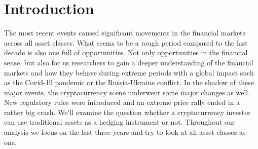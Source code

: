 \documentclass[11pt]{article}
\begin{document}
\titlepageindividualised
\thispagestyle{empty}
\doublespacing

\newpage
\setcounter{page}{1}
\thispagestyle{firststyle}


\newpage
{}

\listoffigures

\thispagestyle{firststyle}
 
\vspace{12px}

\thispagestyle{firststyle}
\listoftables


\newpage
\renewcommand{\contentsname}{Table of Contents}
\thispagestyle{firststyle}

\newpage
\tableofcontents

\newpage
{}
\setcounter{page}{1}
\section{Introduction} \label{sec:introduction}
The most recent events caused significant movements in the financial markets across all asset classes. What seems to be a rough period compared to the last decade is also one full of opportunities. Not only opportunities in the financial sense, but also for us researchers to gain a deeper understanding of the financial markets and how they behave during extreme periods with a global impact such as the Covid-19 pandemic or the Russia-Ukraine conflict. In the shadow of these major events, the cryptocurrency scene underwent some major changes as well. New regulatory rules were introduced and an extreme price rally ended in a rather big crash. 
We'll examine the question whether a cryptocurrency investor can use traditional assets as a hedging instrument or not. Throughout our analysis we focus on the last three years and try to look at all asset classes as one.



\vspace{1cm}

 
\begin{center}
\end{center}
\end{document}
